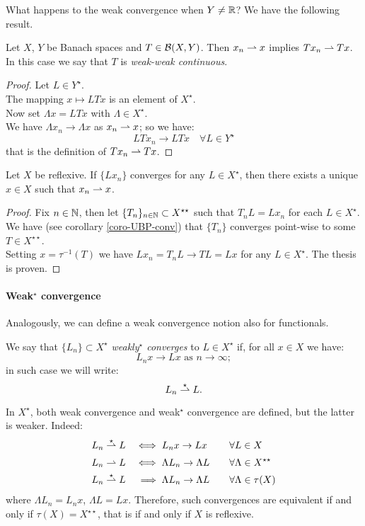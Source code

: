 What happens to the weak convergence when $Y\neq \mathbb R$? We have the following result.

\begin{prop}
	Let $X$, $Y$ be Banach spaces and $T \in \mathcal B(X,Y)$.
	Then $ x_n \rightharpoonup x$ implies $T x_n \rightharpoonup Tx$.
	In this case we say that $T$ is \emph{weak-weak continuous}. 
	\label{prop-bdd-weak-weak}
\end{prop}
\begin{proof}
	Let $L \in Y^\star$.\\
	The mapping $x \mapsto LTx$ is an element of $X^\star$.\\
	Now set $\Lambda x = L T x$ with $\Lambda \in X^\star$.\\
	We have $\Lambda x_n \to \Lambda x$ as $x_n \rightharpoonup x$; so we have:
	$$LTx_n \to LTx \quad \forall L \in Y^\star$$
	that is the definition of $Tx_n \rightharpoonup Tx$.
\end{proof}

\begin{prop}
	Let $X$ be reflexive.
	If $\{Lx_n\}$ converges for any $L \in X^\star$, then there exists a unique $x \in X$ such that $x_n \rightharpoonup x$.
\end{prop}
\begin{proof}
	Fix $n\in \mathbb N$, then let $\{T_n\}_{n\in \mathbb N}\subset X^{\star\star}$ such that $T_nL = L x_n$ for each $L \in X^\star$.\\
	We have (see corollary \vref{coro-UBP-conv}) that $\{T_n\}$ converges point-wise to some $T \in X^{\star\star}$.\\
	Setting $x = \tau^{-1}(T)$ we have $Lx_n = T_n L \to TL = Lx$ for any $L \in X^\star$.
	The thesis is proven.	
\end{proof}

\paragraph{Weak$^{\star}$ convergence} Analogously, we can define a weak convergence notion also for functionals.
\begin{defn}
	We say that $\{L_n\}\subset X^\star$ \emph{weakly$^\star$ converges} to $L \in X^\star$ if, for all $x \in X$ we have:
	$$L_n x \to Lx\text{ as }n \to \infty;$$
	in such case we will write:
	$$L_n \overset{\star}{\rightharpoonup} L.$$
\end{defn}

In $X^\star$, both weak convergence and weak$^\star$ convergence are defined, but the latter is weaker. Indeed:
\begin{alignat*}{4}
	L_n \wsto L && \iff & \; L_n x \to L x \quad &&\forall L\in X \\
	L_n \wto L && \iff & \; \Lambda L_n \to \Lambda L \quad &&\forall \Lambda\in X^{\star\star} \vphantom{\wsto} \\
	L_n \wsto L && \implies & \; \Lambda L_n \to \Lambda L \quad &&\forall \Lambda \in \tau(X)
\end{alignat*}
where $ \Lambda L_n = L_n x$, $ \Lambda L = L x$. Therefore, such convergences are equivalent if and only if $\tau(X)=X^{\star\star}$, that is if and only if $X$ is reflexive.
 
